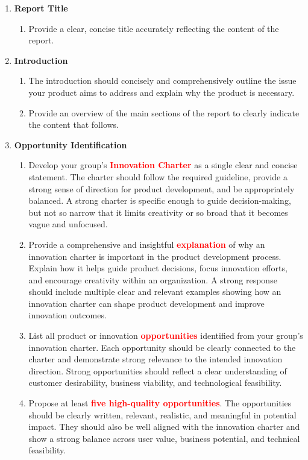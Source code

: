 \begin{enumerate}
    \item \textbf{Report Title}
    \begin{enumerate}
        \item Provide a clear, concise title accurately reflecting the content of the report.
    \end{enumerate}

    \item \textbf{Introduction}
    \begin{enumerate}
        \item The introduction should concisely and comprehensively outline the issue your product aims to address and explain why the product is necessary.
        \item Provide an overview of the main sections of the report to clearly indicate the content that follows.
    \end{enumerate}

    \item \textbf{Opportunity Identification}
    \begin{enumerate}
        \item Develop your group’s \textbf{\textcolor{red}{Innovation Charter}} as a single clear and concise statement. The charter should follow the required guideline, provide a strong sense of direction for product development, and be appropriately balanced. A strong charter is specific enough to guide decision-making, but not so narrow that it limits creativity or so broad that it becomes vague and unfocused.
        \item Provide a comprehensive and insightful \textbf{\textcolor{red}{explanation}} of why an innovation charter is important in the product development process. Explain how it helps guide product decisions, focus innovation efforts, and encourage creativity within an organization. A strong response should include multiple clear and relevant examples showing how an innovation charter can shape product development and improve innovation outcomes.
        \item List all product or innovation \textbf{\textcolor{red}{opportunities}} identified from your group’s innovation charter. Each opportunity should be clearly connected to the charter and demonstrate strong relevance to the intended innovation direction. Strong opportunities should reflect a clear understanding of customer desirability, business viability, and technological feasibility.
        \item Propose at least \textbf{\textcolor{red}{five high-quality opportunities}}. The opportunities should be clearly written, relevant, realistic, and meaningful in potential impact. They should also be well aligned with the innovation charter and show a strong balance across user value, business potential, and technical feasibility.
    \end{enumerate}


\end{enumerate}
